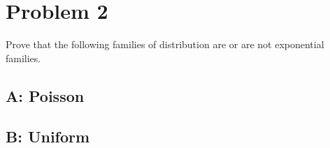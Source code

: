 \section*{Problem 2}

Prove that the following families of distribution are or are not exponential families.

\subsection*{A: Poisson}

\subsection*{B: Uniform}

